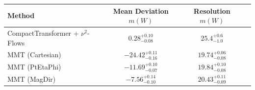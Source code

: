    \begin{tabular}{lccc}
        \toprule
        Method & Mean Deviation $m(W)$ & Resolution $m(W)$ \\
        \midrule
        CompactTransformer + $\nu^2$-Flows & $0.28^{+0.10}_{-0.08}$ & $25.4^{+0.6}_{-1.0}$ \\
        MMT (Cartesian) & $-24.42^{+0.11}_{-0.16}$ & $19.74^{+0.06}_{-0.08}$ \\
        MMT (PtEtaPhi) & $-11.69^{+0.10}_{-0.07}$ & $19.84^{+0.10}_{-0.08}$ \\
        MMT (MagDir) & $-7.56^{+0.14}_{-0.10}$ & $20.43^{+0.11}_{-0.09}$ \\
        \bottomrule
    \end{tabular}